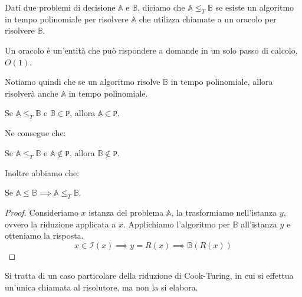 \begin{tcolorbox}[title =$\mathbb{A} \leq_T \mathbb{B}$]
    Dati due problemi di decisione $\mathbb{A}$ e $\mathbb{B}$, diciamo che $\mathbb{A} \leq_T \mathbb{B}$
    se esiste un algoritmo in tempo polinomiale per risolvere $\mathbb{A}$ che utilizza chiamate a un
    oracolo per risolvere $\mathbb{B}$.
\end{tcolorbox}
\begin{tcolorbox}[title = Oracolo]
    Un oracolo è un'entità che può rispondere a domande in un solo passo di calcolo, $O(1)$.
\end{tcolorbox}
Notiamo quindi che se un algoritmo risolve $\mathbb{B}$ in tempo polinomiale, allora risolverà
anche $\mathbb{A}$ in tempo polinomiale. 
\begin{theorem}
    Se $\mathbb{A} \leq_T \mathbb{B}$ e $\mathbb{B} \in \texttt{P}$, allora $\mathbb{A} \in \texttt{P}$.
\end{theorem}
Ne consegue che:
\begin{theorem}
    Se $\mathbb{A} \leq_T \mathbb{B}$ e $\mathbb{A} \not \in \texttt{P}$, allora $\mathbb{B} \not \in \texttt{P}$.
\end{theorem}

Inoltre abbiamo che:
\begin{theorem}
    Se $\mathbb{A} \leq \mathbb{B} \implies \mathbb{A} \leq_T \mathbb{B}$.
\end{theorem}
\begin{proof}
    Consideriamo $x$ istanza del problema $\mathbb{A}$, la trasformiamo nell'istanza $y$, ovvero la riduzione applicata 
    a $x$. Applichiamo l'algoritmo per $\mathbb{B}$ all'istanza $y$ e otteniamo la risposta.
    \[
        x \in \mathcal{I}(x) \implies y = R(x) \implies \mathbb{B}(R(x))
    \]
\end{proof}
Si tratta di un caso particolare della riduzione di Cook-Turing, in cui si effettua un'unica chiamata al risolutore,
ma non la si elabora.

